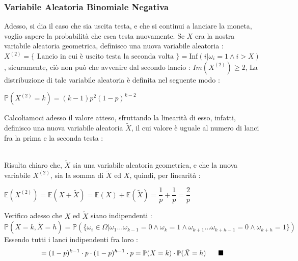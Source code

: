 \documentclass[12pt, letterpaper]{article}
\newcommand{\E}{{\mathbb E}}
\newcommand{\Prob}{{\mathbb P}}
\begin{document}
\subsubsection{Variabile Aleatoria Binomiale Negativa}
Adesso, si dia il caso che sia uscita testa, e che si continui a lanciare la moneta, voglio sapere la probabilità che 
esca testa nuovamente. Se \(X\) era la nostra variabile aleatoria geometrica,
definisco una nuova variabile aleatoria : \(X^{(2)}=\{\text{ Lancio in cui è uscito testa la seconda volta }\}=\text{Inf}(i|\omega_i = 1 \land i>X)\), 
sicuramente, ciò non può che avvenire dal secondo lancio : \(Im(X^{(2)})\ge 2\), 
La distribuzione di tale variabile aleatoria è definita nel seguente modo : \begin{center}
    \(\Prob(X^{(2)}=k)=(k-1)p^2(1-p)^{k-2}\)
\end{center}
Calcoliamoci adesso il valore atteso, sfruttando la linearità di esso, infatti, definisco una nuova 
variabile aleatoria \(\tilde X\), il cui valore è uguale al numero di lanci fra la prima e la seconda testa :
\begin{figure}[h]
\end{figure}\\
Risulta chiaro che, \(\tilde X\) sia una variabile aleatoria geometrica, e che la nuova variabile \(X^{(2)}\), sia 
la somma di \(\tilde X\) ed \(X\), quindi, per linearità : \begin{center}
    \(
    \E(X^{(2)})=\E(X+\tilde X)=\E(X)+\E(\tilde X)=\dfrac{1}{p}+\dfrac{1}{p} =\dfrac{2}{p}     
    \)
\end{center}
Verifico adesso che \(X\) ed \(\tilde X\) siano indipendenti : \begin{equation}
    \Prob(X=k,\tilde X=h)=\Prob(\{\omega_i\in \Omega | \omega_1\dots \omega_{k-1}=0\land \omega_k = 1\land 
    \omega_{k+1}\dots \omega_{k+h-1}=0\land \omega_{k+h}=1\})
\end{equation}
Essendo tutti i lanci indipendenti fra loro : \begin{equation}
    =(1-p)^{k-1}\cdot p \cdot (1-p)^{h-1}\cdot p = \Prob(X=k)\cdot \Prob(\tilde X=h)\text{\hphantom{text}}\blacksquare
\end{equation}
\end{document}
